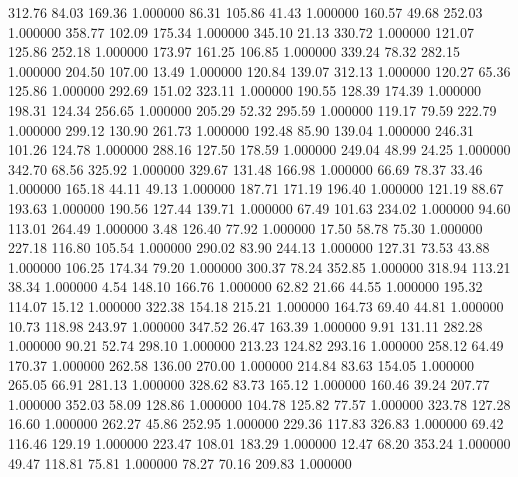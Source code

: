     312.76     84.03    169.36  1.000000
     86.31    105.86     41.43  1.000000
    160.57     49.68    252.03  1.000000
    358.77    102.09    175.34  1.000000
    345.10     21.13    330.72  1.000000
    121.07    125.86    252.18  1.000000
    173.97    161.25    106.85  1.000000
    339.24     78.32    282.15  1.000000
    204.50    107.00     13.49  1.000000
    120.84    139.07    312.13  1.000000
    120.27     65.36    125.86  1.000000
    292.69    151.02    323.11  1.000000
    190.55    128.39    174.39  1.000000
    198.31    124.34    256.65  1.000000
    205.29     52.32    295.59  1.000000
    119.17     79.59    222.79  1.000000
    299.12    130.90    261.73  1.000000
    192.48     85.90    139.04  1.000000
    246.31    101.26    124.78  1.000000
    288.16    127.50    178.59  1.000000
    249.04     48.99     24.25  1.000000
    342.70     68.56    325.92  1.000000
    329.67    131.48    166.98  1.000000
     66.69     78.37     33.46  1.000000
    165.18     44.11     49.13  1.000000
    187.71    171.19    196.40  1.000000
    121.19     88.67    193.63  1.000000
    190.56    127.44    139.71  1.000000
     67.49    101.63    234.02  1.000000
     94.60    113.01    264.49  1.000000
      3.48    126.40     77.92  1.000000
     17.50     58.78     75.30  1.000000
    227.18    116.80    105.54  1.000000
    290.02     83.90    244.13  1.000000
    127.31     73.53     43.88  1.000000
    106.25    174.34     79.20  1.000000
    300.37     78.24    352.85  1.000000
    318.94    113.21     38.34  1.000000
      4.54    148.10    166.76  1.000000
     62.82     21.66     44.55  1.000000
    195.32    114.07     15.12  1.000000
    322.38    154.18    215.21  1.000000
    164.73     69.40     44.81  1.000000
     10.73    118.98    243.97  1.000000
    347.52     26.47    163.39  1.000000
      9.91    131.11    282.28  1.000000
     90.21     52.74    298.10  1.000000
    213.23    124.82    293.16  1.000000
    258.12     64.49    170.37  1.000000
    262.58    136.00    270.00  1.000000
    214.84     83.63    154.05  1.000000
    265.05     66.91    281.13  1.000000
    328.62     83.73    165.12  1.000000
    160.46     39.24    207.77  1.000000
    352.03     58.09    128.86  1.000000
    104.78    125.82     77.57  1.000000
    323.78    127.28     16.60  1.000000
    262.27     45.86    252.95  1.000000
    229.36    117.83    326.83  1.000000
     69.42    116.46    129.19  1.000000
    223.47    108.01    183.29  1.000000
     12.47     68.20    353.24  1.000000
     49.47    118.81     75.81  1.000000
     78.27     70.16    209.83  1.000000
